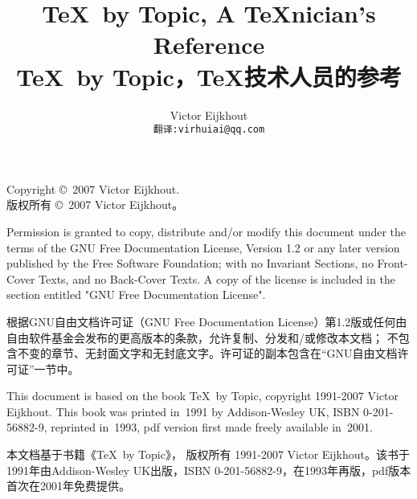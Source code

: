 

\title{\TeX\ by Topic, A \TeX nician's Reference\\ \TeX\ by Topic，\TeX 技术人员的参考}
\date{}
\author{Victor Eijkhout\\{\tt 翻译:virhuiai@qq.com}}
\maketitle
\begin{minipage}[h]{1.0\linewidth}
Copyright \copyright\  2007 Victor Eijkhout.\\
版权所有 \copyright\ 2007 Victor Eijkhout。

Permission is granted to copy, distribute and/or modify this document
under the terms of the GNU Free Documentation License, Version 1.2
or any later version published by the Free Software Foundation;
with no Invariant Sections, no Front-Cover Texts, and no Back-Cover
Texts.  A copy of the license is included in the section entitled "GNU
Free Documentation License".


根据GNU自由文档许可证（GNU Free Documentation License）第1.2版或任何由自由软件基金会发布的更高版本的条款，允许复制、分发和/或修改本文档；
不包含不变的章节、无封面文字和无封底文字。许可证的副本包含在“GNU自由文档许可证”一节中。

\medskip
This document is based on the book \TeX\ by Topic,
copyright 1991-2007 Victor Eijkhout. This book was
printed in~1991 by Addison-Wesley UK, ISBN 0-201-56882-9, reprinted
in~1993, pdf version first made freely available in~2001.

本文档基于书籍《\TeX\ by Topic》，
版权所有 1991-2007 Victor Eijkhout。该书于1991年由Addison-Wesley UK出版，ISBN 0-201-56882-9，在1993年再版，pdf版本首次在2001年免费提供。
\end{minipage}
\tableofcontents
\pagebreak
